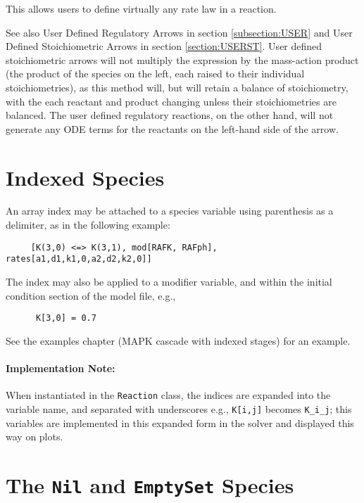 This allows users to define virtually any rate law in a reaction. 

See also User Defined Regulatory Arrows in section \ref{subsection:USER} and User Defined Stoichiometric Arrows in section \ref{section:USERST}. User defined stoichiometric arrows will not multiply the expression by the mass-action product (the product of the species on the left, each raised to their individual stoichiometries), as this method will, but will retain a balance of stoichiometry, with the each reactant and product changing unless their stoichiometries are balanced. The user defined regulatory reactions, on the other hand, will  not generate any ODE terms for the reactants on the left-hand side of the arrow. 

\section{Indexed Species}

An array index may be attached to a species variable using parenthesis as a delimiter, as in the following example:

\begin{lstlisting}
     [K(3,0) <=> K(3,1), mod[RAFK, RAFph], rates[a1,d1,k1,0,a2,d2,k2,0]]
\end{lstlisting}

The index may also be applied to a modifier variable, and within the initial condition section of the model file, e.g., 
\begin{lstlisting}
      K[3,0] = 0.7
\end{lstlisting}
See the examples chapter (MAPK cascade with indexed stages) for an example. 

\paragraph{Implementation Note:} When instantiated in the {\tt Reaction} class, the indices are expanded into the variable name, and separated with underscores e.g., {\tt K[i,j]} becomes {\tt K\_i\_j}; this variables are implemented in this expanded form in the solver and displayed this way on plots. 


\section[{\tt Nil} \& {\tt EmpytSet} Species] {The {\tt Nil} and {\tt EmptySet} Species}

